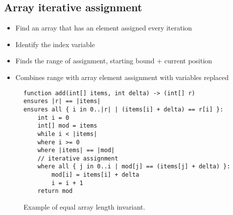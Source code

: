 \subsection{Array iterative assignment}

\begin{itemize}
	\item Find an array that has an element assigned every iteration
	\item Identify the index variable
	\item Finds the range of assignment, starting bound + current position
	\item Combines range with array element assignment with variables replaced
\end{itemize}


\begin{figure}[ht]
\begin{lstlisting}
function add(int[] items, int delta) -> (int[] r)
ensures |r| == |items|
ensures all { i in 0..|r| | (items[i] + delta) == r[i] }:
    int i = 0
    int[] mod = items
    while i < |items|
    where i >= 0
    where |items| == |mod|
    // iterative assignment
    where all { j in 0..i | mod[j] == (items[j] + delta) }:
        mod[i] = items[i] + delta
        i = i + 1
    return mod
\end{lstlisting}
\caption{Example of equal array length invariant.}
\label{lst:equal-array-len}
\end{figure}

